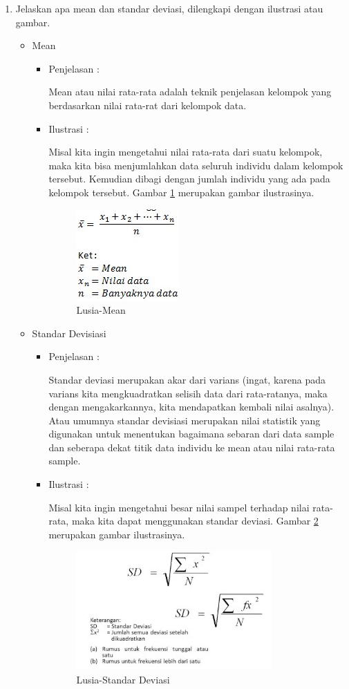 \begin{enumerate}
\item Jelaskan apa mean dan standar deviasi, dilengkapi dengan ilustrasi atau gambar.
	\begin{itemize}
	\item Mean
		\begin{itemize}
		\item Penjelasan :
			\par Mean atau nilai rata-rata adalah teknik penjelasan kelompok yang berdasarkan nilai rata-rat dari kelompok data.
		\item Ilustrasi :
			\par Misal kita ingin mengetahui nilai rata-rata dari suatu kelompok, maka kita bisa menjumlahkan data seluruh individu dalam kelompok tersebut. Kemudian dibagi dengan jumlah individu yang ada pada kelompok tersebut. Gambar \ref{5a6} merupakan gambar ilustrasinya.
			\begin{figure}[!hbtp]
			\centering
			\includegraphics[scale=0.5]{figures/p5a.jpg}
			\caption{Lusia-Mean}
			\label{5a6}
			\end{figure}
		\end{itemize}
	
	\item Standar Devisiasi
		\begin{itemize}
		\item Penjelasan :
			\par Standar deviasi merupakan akar dari varians (ingat, karena pada varians kita mengkuadratkan selisih data dari rata-ratanya, maka dengan mengakarkannya, kita mendapatkan kembali nilai asalnya). Atau umumnya standar devisiasi merupakan nilai statistik yang digunakan untuk menentukan bagaimana sebaran dari data sample dan seberapa dekat titik data individu ke mean atau nilai rata-rata sample.
			
		\item Ilustrasi :
			\par Misal kita ingin mengetahui besar nilai sampel terhadap nilai rata-rata, maka kita dapat menggunakan standar deviasi. Gambar \ref{5a7} merupakan gambar ilustrasinya.
			\begin{figure}[!hbtp]
			\centering
			\includegraphics[scale=0.5]{figures/p5b.jpg}
			\caption{Lusia-Standar Deviasi}
			\label{5a7}
			\end{figure}
		\end{itemize}
		

\end{itemize}
\end{enumerate}
